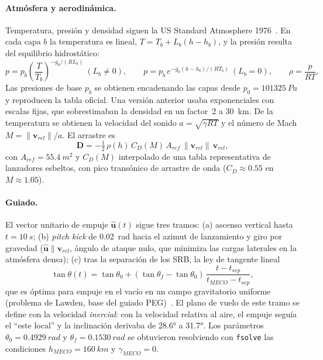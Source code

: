 \documentclass[11pt,a4paper]{article}
\newcommand{\vect}[1]{\mathbf{#1}}
\newcommand{\uvec}[1]{\hat{\mathbf{#1}}}
\begin{document}
\paragraph{Atmósfera y aerodinámica.} Temperatura, presión y densidad siguen la US Standard Atmosphere 1976~\cite{nasa1976std}. En cada capa $b$ la temperatura es lineal, $T=T_b+L_b(h-h_b)$, y la presión resulta del equilibrio hidrostático:
\begin{equation}
p=p_b\left(\frac{T}{T_b}\right)^{-g_0/(R L_b)}\ (L_b\neq0),\qquad
p=p_b\,e^{-g_0(h-h_b)/(R T_b)}\ (L_b=0),\qquad \rho=\frac{p}{RT}.
\end{equation}
Las presiones de base $p_b$ se obtienen encadenando las capas desde $p_0=\SI{101325}{Pa}$ y reproducen la tabla oficial. Una versión anterior usaba exponenciales con escalas fijas, que sobrestimaban la densidad en un factor~2 a \SI{30}{km}. De la temperatura se obtienen la velocidad del sonido $a=\sqrt{\gamma R T}$ y el número de Mach $M=\|\vect v_{rel}\|/a$. El arrastre es
\begin{equation}
\vect D = -\tfrac12\,\rho(h)\,C_D(M)\,A_{ref}\,\|\vect v_{rel}\|\,\vect v_{rel},
\end{equation}
con $A_{ref}=\SI{55.4}{m^2}$ y $C_D(M)$ interpolado de una tabla representativa de lanzadores esbeltos, con pico transónico de arrastre de onda ($C_D\approx0.55$ en $M\approx1.05$).

\paragraph{Guiado.} El vector unitario de empuje $\uvec u(t)$ sigue tres tramos: (a) ascenso vertical hasta $t=\SI{10}{s}$; (b) \emph{pitch kick} de \SI{0.02}{rad} hacia el azimut de lanzamiento y giro por gravedad ($\uvec u\parallel\vect v_{rel}$, ángulo de ataque nulo, que minimiza las cargas laterales en la atmósfera densa); (c) tras la separación de los SRB, la ley de tangente lineal
\begin{equation}
\tan\theta(t)=\tan\theta_0+(\tan\theta_f-\tan\theta_0)\,\frac{t-t_{sep}}{t_{MECO}-t_{sep}},
\end{equation}
que es óptima para empuje en el vacío en un campo gravitatorio uniforme (problema de Lawden, base del guiado PEG)~\cite{curtis2013}. El plano de vuelo de este tramo se define con la velocidad \emph{inercial}: con la velocidad relativa al aire, el empuje seguía el ``este local'' y la inclinación derivaba de \ang{28.6} a \ang{31.7}. Los parámetros $\theta_0=\SI{0.4929}{rad}$ y $\theta_f=\SI{0.1530}{rad}$ se obtuvieron resolviendo con \texttt{fsolve} las condiciones $h_{MECO}=\SI{160}{km}$ y $\gamma_{MECO}=0$.
\end{document}
